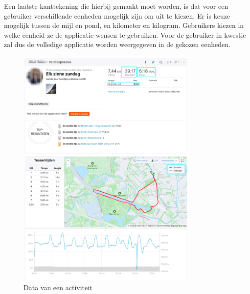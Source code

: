 Een laatste kanttekening die hierbij gemaakt moet worden, is dat voor een
gebruiker verschillende eenheden mogelijk zijn om uit te kiezen. Er is keuze
mogelijk tussen de mijl en pond, en kilometer en kilogram. Gebruikers kiezen in
welke eenheid ze de applicatie wensen te gebruiken. Voor de gebruiker in
kwestie zal dus de volledige applicatie worden weergegeven in de gekozen
eenheden.
\begin{figure}
    \centering
    \includegraphics[width=0.8\textwidth]{fig/VoorbeeldActiviteiten/VoorbeeldActiviteit_Personal.png}
    \caption{Data van een activiteit}\label{fig:activityData}
\end{figure}

